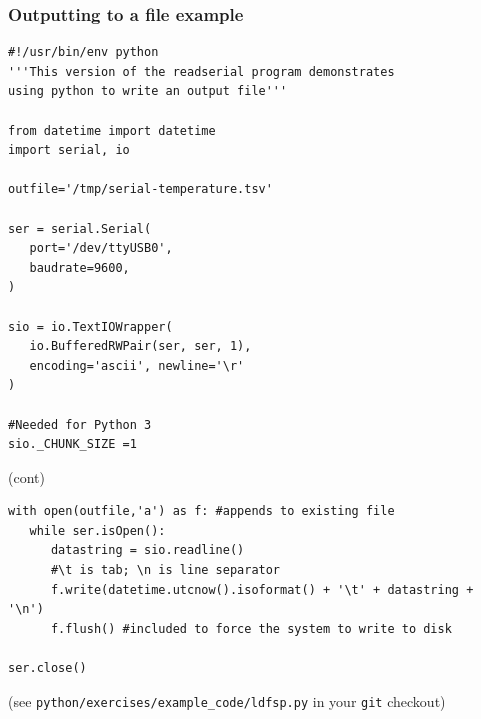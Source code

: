 \documentclass[aspectratio=1610,9pt]{beamer} %
\begin{document}
\begin{frame}[fragile]
\frametitle{Outputting to a file
example}

\begin{verbatim}
#!/usr/bin/env python
'''This version of the readserial program demonstrates
using python to write an output file'''

from datetime import datetime
import serial, io

outfile='/tmp/serial-temperature.tsv'

ser = serial.Serial(
   port='/dev/ttyUSB0',
   baudrate=9600,
)

sio = io.TextIOWrapper(
   io.BufferedRWPair(ser, ser, 1),
   encoding='ascii', newline='\r'
)

#Needed for Python 3
sio._CHUNK_SIZE =1

\end{verbatim}
(cont)
\end{frame}
\begin{frame}[fragile]
\begin{verbatim}
with open(outfile,'a') as f: #appends to existing file
   while ser.isOpen():
      datastring = sio.readline()
      #\t is tab; \n is line separator
      f.write(datetime.utcnow().isoformat() + '\t' + datastring + '\n')
      f.flush() #included to force the system to write to disk

ser.close()
\end{verbatim}

(see \texttt{python/exercises/example\_code/ldfsp.py} in your
\texttt{git} checkout)

\end{frame}
\end{document}

